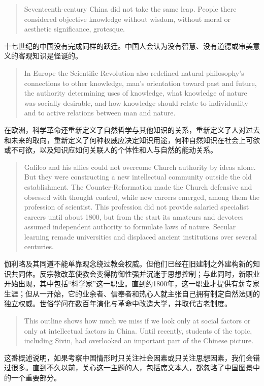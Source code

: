\documentclass[UTF8,zihao=-4]{ctexart}
\newenvironment{enblock}
  {\par\smallskip\noindent{\scriptsize\bfseries English}\par\begin{quote}\small}
  {\end{quote}}
\newenvironment{zhblock}
  {\par\noindent{\scriptsize\bfseries 中文}\par}
  {\par\medskip}
\begin{document}
\begin{enblock}
Seventeenth-century China did not take the same leap. People there considered objective knowledge without wisdom, without moral or aesthetic significance, grotesque.
\end{enblock}
\begin{zhblock}
十七世纪的中国没有完成同样的跃迁。中国人会认为没有智慧、没有道德或审美意义的客观知识是怪诞的。
\end{zhblock}

\begin{enblock}
In Europe the Scientific Revolution also redefined natural philosophy's connections to other knowledge, man's orientation toward past and future, the authority determining uses of knowledge, what knowledge of nature was socially desirable, and how knowledge should relate to individuality and to active relations between man and nature.
\end{enblock}
\begin{zhblock}
在欧洲，科学革命还重新定义了自然哲学与其他知识的关系，重新定义了人对过去和未来的取向，重新定义了何种权威应决定知识用途，何种自然知识在社会上可欲或不可欲，以及知识应如何关联人的个体性和人与自然的能动关系。
\end{zhblock}

\begin{enblock}
Galileo and his allies could not overcome Church authority by ideas alone. But they were constructing a new intellectual community outside the old establishment. The Counter-Reformation made the Church defensive and obsessed with thought control, while new careers emerged, among them the profession of scientist. This profession did not provide salaried specialist careers until about 1800, but from the start its amateurs and devotees assumed independent authority to formulate laws of nature. Secular learning remade universities and displaced ancient institutions over several centuries.
\end{enblock}
\begin{zhblock}
伽利略及其同道不能单靠观念绕过教会权威。但他们已经在旧建制之外建构新的知识共同体。反宗教改革使教会变得防御性强并沉迷于思想控制；与此同时，新职业开始出现，其中包括“科学家”这一职业。直到约1800年，这一职业才提供有薪专家生涯；但从一开始，它的业余者、信奉者和热心人就主张自己拥有制定自然法则的独立权威。世俗学问在数百年演化与革命中改造大学，并取代古老制度。
\end{zhblock}

\begin{enblock}
This outline shows how much we miss if we look only at social factors or only at intellectual factors in China. Until recently, students of the topic, including Sivin, had overlooked an important part of the Chinese picture.
\end{enblock}
\begin{zhblock}
这番概述说明，如果考察中国情形时只关注社会因素或只关注思想因素，我们会错过很多。直到不久以前，关心这一主题的人，包括席文本人，都忽略了中国图景中的一个重要部分。
\end{zhblock}
\end{document}
